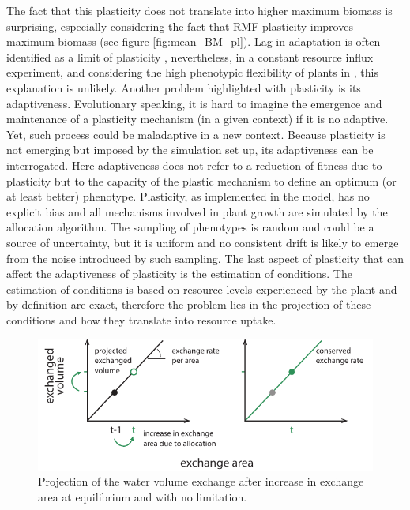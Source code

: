 The fact that this plasticity does not translate into higher maximum biomass is surprising, especially considering the fact that RMF plasticity improves maximum biomass (see figure \ref{fig:mean_BM_pl}). Lag in adaptation is often identified as a limit of plasticity \parencite{dewitt_costs_1998, van_kleunen_constraints_2005}, nevertheless, in a constant resource influx experiment, and considering the high phenotypic flexibility of plants in \model, this explanation is unlikely. Another problem highlighted with plasticity is its adaptiveness. Evolutionary speaking, it is hard to imagine the emergence and maintenance of a plasticity mechanism (in a given context) if it is no adaptive. Yet, such process could be maladaptive in a new context. Because plasticity is not emerging but imposed by the simulation set up, its adaptiveness can be interrogated. Here adaptiveness does not refer to a reduction of fitness due to plasticity but to the capacity of the plastic mechanism to define an optimum (or at least better) phenotype. Plasticity, as implemented in the model, has no explicit bias and all mechanisms involved in plant growth are simulated by the allocation algorithm. The sampling of phenotypes is random and could be a source of uncertainty, but it is uniform and no consistent drift is likely to emerge from the noise introduced by such sampling. The last aspect of plasticity that can affect the adaptiveness of plasticity is the estimation of conditions. The estimation of conditions is based on resource levels experienced by the plant and by definition are exact, therefore the problem lies in the projection of these conditions and how they translate into resource uptake.


\begin{figure}\label{fig:exchange_volume_projection}
\includegraphics[width = \textwidth]{./2_PP/Figures/Concepts/exchange_volume_projection.pdf}
\caption{Projection of the water volume exchange after increase in exchange area at equilibrium and with no limitation.}
\end{figure}

